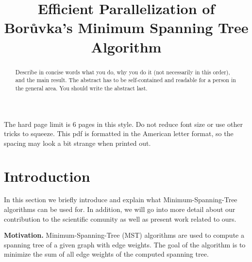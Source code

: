 \documentclass[letterpaper]{article}
\title{Efficient Parallelization of Bor\r{u}vka's Minimum Spanning Tree Algorithm}
\newcommand{\mypar}[1]{{\bf #1.}}
\begin{document}
%
\maketitle
%

The hard page limit is 6 pages in this style. Do not reduce font size
or use other tricks to squeeze. This pdf is formatted in the American letter format, so the spacing may look a bit strange when printed out.

\begin{abstract}
Describe in concise words what you do, why you do it (not necessarily
in this order), and the main result.  The abstract has to be
self-contained and readable for a person in the general area. You
should write the abstract last.
\end{abstract}

\section{Introduction}
\label{sec:intro}
In this section we briefly introduce and explain what Minimum-Spanning-Tree algorithms can be used for. In addition, we
will go into more detail about our contribution to the scientific comunity as well as present work related to ours.

\mypar{Motivation}
Minimum-Spanning-Tree (MST) algorithms are used to compute a spanning tree of a given graph with edge weights. The goal
of the algorithm is to minimize the sum of all edge weights of the computed spanning tree.
\end{document}
